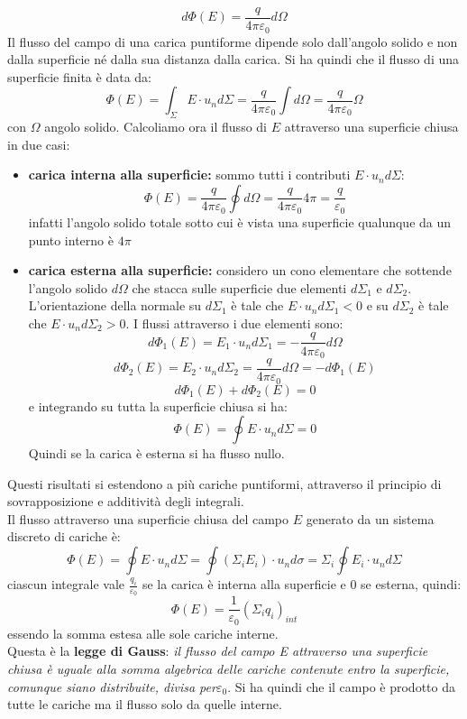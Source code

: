 \documentclass[a4paper,12pt, oneside]{book}
\begin{document}
$$d\Phi(E)=\frac{q}{4\pi\varepsilon_0}d\Omega$$
Il flusso del campo di una carica puntiforme dipende solo dall'angolo solido e non dalla superficie né dalla sua distanza dalla carica. Si ha quindi che il flusso di una superficie finita è data da:
$$\Phi(E)=\int_\Sigma E\cdot u_nd\Sigma=\frac{q}{4\pi\varepsilon_0}\int d\Omega=\frac{q}{4\pi\varepsilon_0}\Omega$$
con $\Omega$ angolo solido. Calcoliamo ora il flusso di $E$ attraverso una superficie chiusa in due casi:
\begin{itemize}
\item \textbf{carica interna alla superficie:} sommo tutti i contributi $E\cdot u_nd\Sigma$:
$$\Phi(E)=\frac{q}{4\pi\varepsilon_0}\oint d\Omega=\frac{q}{4\pi\varepsilon_0}4\pi=\frac{q}{\varepsilon_0}$$
infatti l'angolo solido totale sotto cui è vista una superficie qualunque da un punto interno è $4\pi$
\item \textbf{carica esterna alla superficie:} considero un cono elementare che sottende l'angolo solido $d\Omega$ che stacca sulle superficie due elementi $d\Sigma_1$ e $d\Sigma_2$. L'orientazione della normale su $d\Sigma_1$ è tale che $E\cdot u_nd\Sigma_1<0$ e su $d\Sigma_2$ è tale che $E\cdot u_nd\Sigma_2>0$. I flussi attraverso i due elementi sono:
$$d\Phi_1(E)=E_1\cdot u_nd\Sigma_1=-\frac{q}{4\pi\varepsilon_0}d\Omega$$
$$d\Phi_2(E)=E_2\cdot u_nd\Sigma_2=\frac{q}{4\pi\varepsilon_0}d\Omega=-d\Phi_1(E)$$
$$d\Phi_1(E)+d\Phi_2(E)=0$$
e integrando su tutta la superficie chiusa si ha:
$$\Phi(E)=\oint E\cdot u_nd\Sigma=0$$
Quindi se la carica è esterna si ha flusso nullo.\\
\end{itemize}
Questi risultati si estendono a più cariche puntiformi, attraverso il principio di sovrapposizione e additività degli integrali.\\
Il flusso attraverso una superficie chiusa del campo $E$ generato da un sistema discreto di cariche è:
$$\Phi(E)=\oint E\cdot u_nd\Sigma=\oint (\Sigma_iE_i)\cdot u_nd\sigma=\Sigma_i\oint E_i\cdot u_nd\Sigma$$
ciascun integrale vale $\frac{q_i}{\varepsilon_0}$ se la carica è interna alla superficie e 0 se esterna, quindi:
$$\Phi(E)=\frac{1}{\varepsilon_0}(\Sigma_iq_i)_{int}$$
essendo la somma estesa alle sole cariche interne.\\
Questa è la \textbf{legge di Gauss}: \textit{il flusso del campo E attraverso una superficie chiusa è uguale alla somma algebrica delle cariche contenute entro la superficie, comunque siano distribuite, divisa per}$\varepsilon_0$. Si ha quindi che il campo è prodotto da tutte le cariche ma il flusso solo da quelle interne.\\
\end{document}
